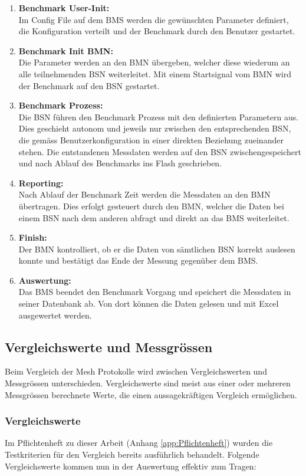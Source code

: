 \begin{enumerate}
	\item \textbf{Benchmark User-Init:}\\
	Im Config File auf dem BMS werden die gewünschten Parameter definiert, die Konfiguration verteilt und der Benchmark durch den Benutzer gestartet.
	\item \textbf{Benchmark Init BMN:}\\
	Die Parameter werden an den BMN übergeben, welcher diese wiederum an alle teilnehmenden BSN weiterleitet. Mit einem Startsignal vom BMN wird der Benchmark auf den BSN gestartet.
	\item \textbf{Benchmark Prozess:}\\
	Die BSN führen den Benchmark Prozess mit den definierten Parametern aus.
	Dies geschieht autonom und jeweils nur zwischen den entsprechenden BSN, die gemäss Benutzerkonfiguration in einer direkten Beziehung zueinander stehen. Die entstandenen Messdaten werden auf den BSN zwischengespeichert und nach Ablauf des Benchmarks ins Flash geschrieben.
	\item \textbf{Reporting:}\\
	Nach Ablauf der Benchmark Zeit werden die Messdaten an den BMN übertragen. Dies erfolgt gesteuert durch den BMN, welcher die Daten bei einem BSN nach dem anderen abfragt und direkt an das BMS weiterleitet.
	\item \textbf{Finish:}\\
	Der BMN kontrolliert, ob er die Daten von sämtlichen BSN korrekt auslesen konnte und bestätigt das Ende der Messung gegenüber dem BMS.
	\item \textbf{Auswertung:}\\
	Das BMS beendet den Benchmark Vorgang und speichert die Messdaten in seiner Datenbank ab. Von dort können die Daten gelesen und mit Excel ausgewertet werden.
\end{enumerate}

\subsection{Vergleichswerte und Messgrössen}\label{subsec:VergleichswerteundMessgrössenMesh}
Beim Vergleich der Mesh Protokolle wird zwischen Vergleichswerten und Messgrössen unterschieden. Vergleichswerte sind meist aus einer oder mehreren Messgrössen berechnete Werte, die einen aussagekräftigen Vergleich ermöglichen.

\subsubsection{Vergleichswerte}\label{subsubsec:Vergleichswerte}
Im Pflichtenheft zu dieser Arbeit (Anhang \ref{app:Pflichtenheft}) wurden die Testkriterien für den Vergleich bereits ausführlich behandelt.
Folgende Vergleichswerte kommen nun in der Auswertung effektiv zum Tragen:

